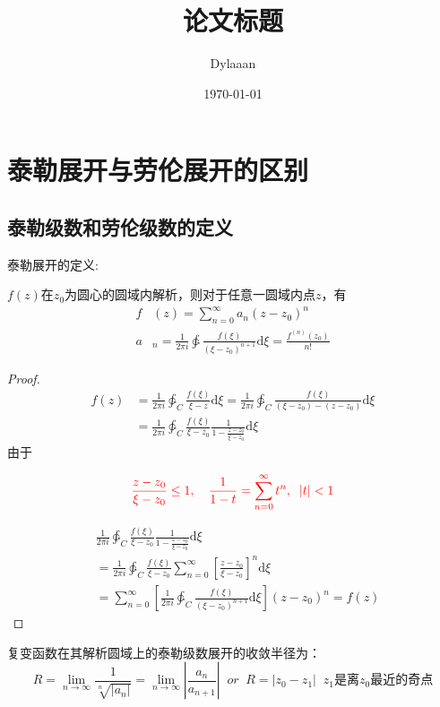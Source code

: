 \documentclass[12pt, a4paper, oneside]{ctexart}
\title{\textbf{论文标题}}
\author{Dylaaan}
\date{\today}
\def\D{\mathrm{d}}
\newcommand{\F}[1][z]
{\ensuremath{f(#1)}}
\begin{document}
\maketitle

\setcounter{page}{0}
\maketitle
\thispagestyle{empty}

\newpage
{}
\setcounter{page}{1}
\tableofcontents
\newpage
\setcounter{page}{1}

\section{泰勒展开与劳伦展开的区别}

\subsection{泰勒级数和劳伦级数的定义}

泰勒展开的定义:

$\F$在$z_0$为圆心的圆域内解析，则对于任意一圆域内点$z$，有
\begin{align*}
    f & (z)=\sum_{n=0}^\infty a_n(z-z_0)^n                                                                 \\
    a & _n=\frac{1}{2\pi i}\ointctrclockwise \frac{\F[\xi]}{(\xi-z_0)^{n+1}}\D \xi=\frac{f^{(n)}(z_0)}{n!}
\end{align*}
\begin{proof}
    \begin{align*}
        \F & =\frac{1}{2\pi i}\ointctrclockwise_C \frac{\F[\xi]}{\xi-z}\D \xi=\frac{1}{2\pi i}\ointctrclockwise_C \frac{\F[\xi]}{(\xi-z_0)-(z-z_0)}\D \xi \\
           & =\frac{1}{2\pi i}\ointctrclockwise_C \frac{\F[\xi]}{\xi-z_0}\frac{1}{1-\frac{z-z_0}{\xi-z_0}}\D \xi
    \end{align*}
    由于


    \begin{equation}
        \label{spanseries}
        \color{red}
        \frac{z-z_0}{\xi-z_0}\le 1,\quad\frac{1}{1-t}=\sum_{n=0}^\infty t^n,\;\; |t|<1
    \end{equation}

    \begin{align*}
         & \frac{1}{2\pi i}\ointctrclockwise_C \frac{\F[\xi]}{\xi-z_0}\frac{1}{1-\frac{z-z_0}{\xi-z_0}}\D \xi                       \\
         & =\frac{1}{2\pi i}\ointctrclockwise_C \frac{\F[\xi]}{\xi-z_0}\sum_{n=0}^\infty \left[\frac{z-z_0}{\xi-z_0}\right]^n\D \xi \\
         & =\sum_{n=0}^\infty \left[\frac{1}{2\pi i}\ointctrclockwise_C \frac{\F[\xi]}{(\xi-z_0)^{n+1}}\D \xi\right](z-z_0)^n=\F
    \end{align*}
\end{proof}
复变函数在其解析圆域上的泰勒级数展开的收敛半径为：
$$
    R=\lim_{n\to \infty}\frac{1}{\sqrt[n]{|a_n|}}=\lim_{n\to \infty} \left| \frac{a_n}{a_{n+1}} \right| \;\; or \;\; R=|z_0-z_1| \;\; \text{$z_1$是离$z_0$最近的奇点}
$$
\end{document}
